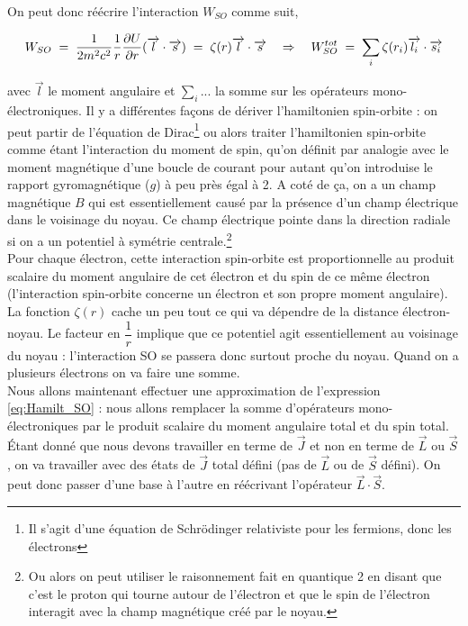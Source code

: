 On peut donc réécrire l'interaction $W_{SO}$ comme suit, 

\begin{equation}
    W_{SO} \; = \;  \dfrac{1}{2m^2c^2}\dfrac{1}{r}\dfrac{\partial U}{\partial r}(\overrightarrow{l}\cdot\overrightarrow{s}) \; = \;  \zeta(r)\overrightarrow{l}\cdot\overrightarrow{s} 
    \quad\Rightarrow\quad 
    W_{SO}^{tot} \; = \; \sum_i\zeta(r_i)\overrightarrow{l_i}\cdot\overrightarrow{s_i}
    \label{eq:Hamilt_SO}
\end{equation}

avec $\overrightarrow{l}$ le moment angulaire et $\sum_i...$ la somme sur les opérateurs mono-électroniques. Il y a différentes façons de dériver l’hamiltonien spin-orbite : on peut partir de l’équation de Dirac\footnote{Il s'agit d'une équation de Schrödinger relativiste pour les fermions, donc les électrons} ou alors traiter l’hamiltonien spin-orbite comme étant l’interaction du moment de spin, qu’on définit par analogie avec le moment magnétique d’une boucle de courant pour autant qu’on introduise le rapport gyromagnétique ($g$) à peu près égal à 2. A coté de ça, on a un champ magnétique $B$ qui est essentiellement causé par la présence d’un champ électrique dans le voisinage du noyau. Ce champ électrique pointe dans la direction radiale si on a un potentiel à symétrie centrale.\footnote{Ou alors on peut utiliser le raisonnement fait en quantique 2 en disant que c'est le proton qui tourne autour de l'électron et que le spin de l'électron interagit avec la champ magnétique créé par le noyau.}\\ 

Pour chaque électron, cette interaction spin-orbite est proportionnelle au produit scalaire du moment angulaire de cet électron et du spin de ce même électron (l'interaction spin-orbite concerne un électron et son propre moment angulaire). La fonction $\zeta(r)$ cache un peu tout ce qui va dépendre de la distance électron-noyau. Le facteur en $\dfrac{1}{r}$ implique que ce potentiel agit essentiellement au voisinage du noyau : l'interaction SO se passera donc surtout proche du noyau. Quand on a plusieurs électrons on va faire une somme.\\

Nous allons maintenant effectuer une approximation de l'expression \eqref{eq:Hamilt_SO} : nous allons remplacer la somme d’opérateurs mono-électroniques par le produit scalaire du moment angulaire total et du spin total. Étant donné que nous devons travailler en terme de $\overrightarrow{J}$ et non en terme de $\overrightarrow{L}$ ou $\overrightarrow{S}$, on va travailler avec des états de $\overrightarrow{J}$ total défini (pas de $\overrightarrow{L}$ ou de $\overrightarrow{S}$ défini). On peut donc passer d’une base à l’autre en réécrivant l’opérateur $\overrightarrow{L}\cdot\overrightarrow{S}$.

